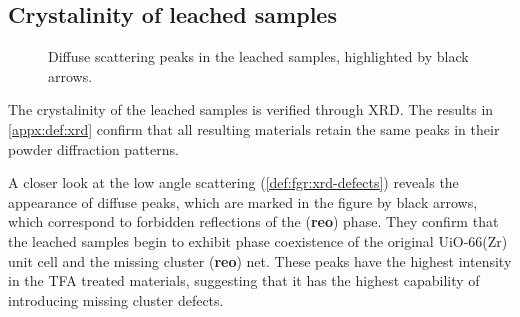 
\subsection{Crystalinity of leached samples}\label{def:xrd}

\begin{wrapfigure}[13]{r}{0.3\textwidth}
    \centering
    \captionsetup{format=plain}
    \caption{Diffuse scattering peaks in the  leached 
    samples, highlighted by black arrows.}%
    \label{def:fgr:xrd-defects}
\end{wrapfigure}

The crystalinity of the leached samples is verified through 
XRD. The results in \autoref{appx:def:xrd} confirm that all 
resulting materials retain the same peaks in their powder
diffraction patterns.

A closer look at the low angle scattering (\autoref{def:fgr:xrd-defects})
reveals the appearance of diffuse peaks, which are marked in the 
figure by black arrows, which correspond to forbidden
reflections of the (\textbf{reo}) phase. They confirm that the 
leached samples begin to exhibit phase coexistence of 
the original UiO-66(Zr) unit cell and the missing cluster
(\textbf{reo}) net. These peaks have the highest intensity in 
the TFA treated materials, suggesting that it has the highest 
capability of introducing missing cluster defects.